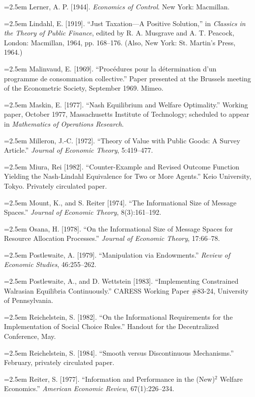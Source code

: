 \documentclass[12pt, letterpaper]{article}
\newcommand{\bibentry}[1]{\noindent\hangindent=2.5em\hangafter=1 \small #1 \par\vspace{0.7em}}
\begin{document}
\bibentry{Lerner, A. P. [1944]. \textit{Economics of Control}. New York: Macmillan.}

\bibentry{Lindahl, E. [1919]. ``Just Taxation---A Positive Solution,'' in \textit{Classics in the Theory of Public Finance}, edited by R. A. Musgrave and A. T. Peacock, London: Macmillan, 1964, pp. 168--176. (Also, New York: St. Martin's Press, 1964.)}

\bibentry{Malinvaud, E. [1969]. ``Procédures pour la détermination d'un programme de consommation collective.'' Paper presented at the Brussels meeting of the Econometric Society, September 1969. Mimeo.}

\bibentry{Maskin, E. [1977]. ``Nash Equilibrium and Welfare Optimality.'' Working paper, October 1977, Massachusetts Institute of Technology; scheduled to appear in \textit{Mathematics of Operations Research}.}

\bibentry{Milleron, J.-C. [1972]. ``Theory of Value with Public Goods: A Survey Article.'' \textit{Journal of Economic Theory}, 5:419--477.}

\bibentry{Miura, Rei [1982]. ``Counter-Example and Revised Outcome Function Yielding the Nash-Lindahl Equivalence for Two or More Agents.'' Keio University, Tokyo. Privately circulated paper.}

\bibentry{Mount, K., and S. Reiter [1974]. ``The Informational Size of Message Spaces.'' \textit{Journal of Economic Theory}, 8(3):161--192.}

\bibentry{Osana, H. [1978]. ``On the Informational Size of Message Spaces for Resource Allocation Processes.'' \textit{Journal of Economic Theory}, 17:66--78.}

\bibentry{Postlewaite, A. [1979]. ``Manipulation via Endowments.'' \textit{Review of Economic Studies}, 46:255--262.}

\bibentry{Postlewaite, A., and D. Wettstein [1983]. ``Implementing Constrained Walrasian Equilibria Continuously.'' CARESS Working Paper \#83-24, University of Pennsylvania.}

\bibentry{Reichelstein, S. [1982]. ``On the Informational Requirements for the Implementation of Social Choice Rules.'' Handout for the Decentralized Conference, May.}

\bibentry{Reichelstein, S. [1984]. ``Smooth versus Discontinuous Mechanisms.'' February, privately circulated paper.}

\bibentry{Reiter, S. [1977]. ``Information and Performance in the (New)$^2$ Welfare Economics.'' \textit{American Economic Review}, 67(1):226--234.}
\end{document}
